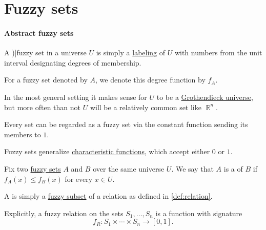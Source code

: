 \section{Fuzzy sets}\label{sec:fuzzy_sets}

\paragraph{Abstract fuzzy sets}

\begin{definition}\label{def:fuzzy_set}
  A \term[ru=нечёткое множество (\cite[def. 1.1.1]{Орловский1981НечёткиеМножества})]{fuzzy set} in a universe \( U \) is simply a \hyperref[def:labeled_set]{labeling} of \( U \) with numbers from the unit interval designating degrees of membership.

  For a fuzzy set denoted by \( A \), we denote this degree function by \( f_A \).
\end{definition}
\begin{comments}
  \item In the most general setting it makes sense for \( U \) to be a \hyperref[def:grothendieck_universe]{Grothendieck universe}, but more often than not \( U \) will be a relatively common set like \( \BbbR^n \).

  \item Every set can be regarded as a fuzzy set via the constant function sending its members to \( 1 \).

  \item Fuzzy sets generalize \hyperref[def:subset_characteristic_function]{characteristic functions}, which accept either \( 0 \) or \( 1 \).
\end{comments}

\begin{definition}\label{def:fuzzy_subset}
  Fix two \hyperref[def:fuzzy_set]{fuzzy sets} \( A \) and \( B \) over the same universe \( U \). We say that \( A \) is a  of \( B \) if \( f_A(x) \leq f_B(x) \) for every \( x \in U \).
\end{definition}

\begin{definition}\label{def:fuzzy_relation}
  A  is simply a \hyperref[def:fuzzy_set]{fuzzy subset} of a relation as defined in \cref{def:relation}.

  Explicitly, a fuzzy relation on the sets \( S_1, \ldots, S_n \) is a function with signature
  \begin{equation*}
    f_R: S_1 \times \cdots \times S_n \to [0, 1].
  \end{equation*}
\end{definition}

